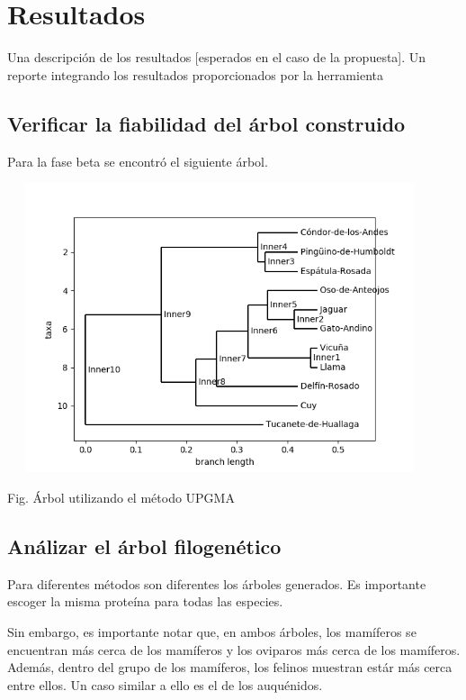 \documentclass[a4paper]{article}
\begin{document}
\section{Resultados}
Una descripción de los resultados [esperados en el caso de la propuesta]. Un reporte integrando los resultados proporcionados por la herramienta

\subsection{Verificar la fiabilidad del árbol construido}
Para la fase beta se encontró el siguiente árbol.

\begin{center}
	\includegraphics[width=12.5cm,height=8.5cm]{arbol.png}
	
	Fig. Árbol utilizando el método UPGMA
\end{center}

\subsection{Análizar el árbol filogenético}
Para diferentes métodos son diferentes los árboles generados. Es importante escoger la misma proteína para todas las especies.

Sin embargo, es importante notar que, en ambos árboles, los mamíferos se encuentran más cerca de los mamíferos y los oviparos más cerca de los mamíferos. Además, dentro del grupo de los mamíferos, los felinos muestran estár más cerca entre ellos. Un caso similar a ello es el de los auquénidos.
\end{document}
